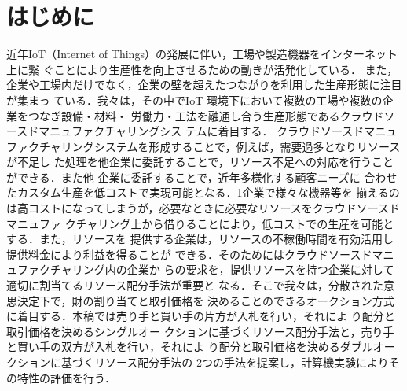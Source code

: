 \documentclass{ujarticle}
\begin{document}
\maketitle

\section{はじめに}
近年IoT（Internet of Things）の発展に伴い，工場や製造機器をインターネット上に繋
ぐことにより生産性を向上させるための動きが活発化している．
また，企業や工場内だけでなく，企業の壁を超えたつながりを利用した生産形態に注目が集まっ
ている\cite{IVI}．我々は，その中でIoT 環境下において複数の工場や複数の企業をつなぎ設備・材料・
労働力・工法を融通し合う生産形態であるクラウドソースドマニュファクチャリングシス
テムに着目する\cite{IEC}．
クラウドソースドマニュファクチャリングシステムを形成することで，例えば，需要過多となりリソースが不足し
た処理を他企業に委託することで，リソース不足への対応を行うことができる．また他
企業に委託することで，近年多様化する顧客ニーズに
合わせたカスタム生産を低コストで実現可能となる．1企業で様々な機器等を
揃えるのは高コストになってしまうが，必要なときに必要なリソースをクラウドソースドマニュファ
クチャリング上から借りることにより，低コストでの生産を可能とする．また，リソースを
提供する企業は，リソースの不稼働時間を有効活用し提供料金により利益を得ることが
できる\cite{勝村}．そのためにはクラウドソースドマニュファクチャリング内の企業か
らの要求を，提供リソースを持つ企業に対して適切に割当てるリソース配分手法が重要と
なる\cite{Wu}．そこで我々は，分散された意思決定下で，財の割り当てと取引価格を
決めることのできるオークション方式に着目する．本稿では売り手と買い手の片方が入札を行い，それによ
り配分と取引価格を決めるシングルオー
クションに基づくリソース配分手法と，売り手と買い手の双方が入札を行い，それによ
り配分と取引価格を決めるダブルオークションに基づくリソース配分手法の
2つの手法を提案し，計算機実験によりその特性の評価を行う．
\end{document}
